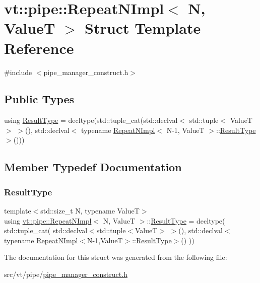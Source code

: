 \hypertarget{structvt_1_1pipe_1_1_repeat_n_impl}{}\section{vt\+:\+:pipe\+:\+:Repeat\+N\+Impl$<$ N, ValueT $>$ Struct Template Reference}
\label{structvt_1_1pipe_1_1_repeat_n_impl}


{\ttfamily \#include $<$pipe\+\_\+manager\+\_\+construct.\+h$>$}

\subsection*{Public Types}
\begin{DoxyCompactItemize}
\item 
using \hyperlink{structvt_1_1pipe_1_1_repeat_n_impl_af675d7cb96eea2f284afccfed13576a4}{Result\+Type} = decltype(std\+::tuple\+\_\+cat(std\+::declval$<$ std\+::tuple$<$ ValueT $>$ $>$(), std\+::declval$<$ typename \hyperlink{structvt_1_1pipe_1_1_repeat_n_impl}{Repeat\+N\+Impl}$<$ N-\/1, ValueT $>$\+::\hyperlink{structvt_1_1pipe_1_1_repeat_n_impl_af675d7cb96eea2f284afccfed13576a4}{Result\+Type} $>$()))
\end{DoxyCompactItemize}


\subsection{Member Typedef Documentation}
\mbox{\label{structvt_1_1pipe_1_1_repeat_n_impl_af675d7cb96eea2f284afccfed13576a4}} 
\subsubsection{\texorpdfstring{Result\+Type}{ResultType}}
{\footnotesize\ttfamily template$<$std\+::size\+\_\+t N, typename ValueT$>$ \\
using \hyperlink{structvt_1_1pipe_1_1_repeat_n_impl}{vt\+::pipe\+::\+Repeat\+N\+Impl}$<$ N, ValueT $>$\+::\hyperlink{structvt_1_1pipe_1_1_repeat_n_impl_af675d7cb96eea2f284afccfed13576a4}{Result\+Type} =  decltype( std\+::tuple\+\_\+cat( std\+::declval$<$std\+::tuple$<$ValueT$>$ $>$(), std\+::declval$<$typename \hyperlink{structvt_1_1pipe_1_1_repeat_n_impl}{Repeat\+N\+Impl}$<$N-\/1,ValueT$>$\+::\hyperlink{structvt_1_1pipe_1_1_repeat_n_impl_af675d7cb96eea2f284afccfed13576a4}{Result\+Type}$>$() ))}



The documentation for this struct was generated from the following file\+:\begin{DoxyCompactItemize}
\item 
src/vt/pipe/\hyperlink{pipe__manager__construct_8h}{pipe\+\_\+manager\+\_\+construct.\+h}\end{DoxyCompactItemize}
